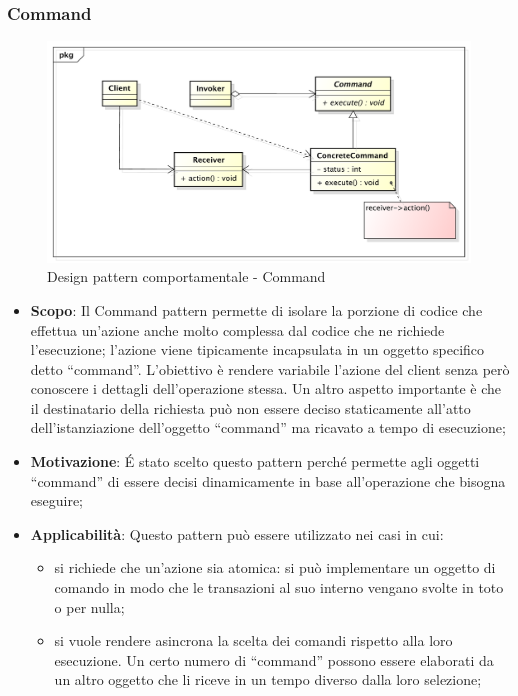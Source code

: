 		\newpage
		\subsubsection{Command} %
		\label{ssub:command}
		\begin{figure}[htbp]
			\centering
			\centerline{\includegraphics[scale=0.5]{./images/designpatternappendice/command.pdf}}
			\caption{Design pattern comportamentale - Command}
		\end{figure}
		
		\begin{itemize}
			\item \textbf{Scopo}: Il Command pattern permette di isolare la porzione di codice che effettua un'azione anche molto complessa dal codice che ne richiede l'esecuzione; l'azione viene tipicamente incapsulata in un oggetto specifico detto ``command''. 
			L'obiettivo è rendere variabile l'azione del client senza però conoscere i dettagli dell'operazione stessa. Un altro aspetto importante è che il destinatario della richiesta può non essere deciso staticamente all'atto dell'istanziazione dell'oggetto ``command'' ma ricavato a tempo di esecuzione;
			\item \textbf{Motivazione}: \'E stato scelto questo pattern perché permette agli oggetti ``command'' di essere decisi dinamicamente in base all'operazione che bisogna eseguire;
			\item \textbf{Applicabilità}: Questo pattern può essere utilizzato nei casi in cui:
			\begin{itemize}
			\item si richiede che un'azione sia atomica: si può implementare un oggetto di comando in modo che le transazioni al suo interno vengano svolte in toto o per nulla;
			\item si vuole rendere asincrona la scelta dei comandi rispetto alla loro esecuzione. Un certo numero di ``command'' possono essere elaborati da un altro oggetto che li riceve in un tempo diverso dalla loro selezione;
			\end{itemize}

		\end{itemize}



